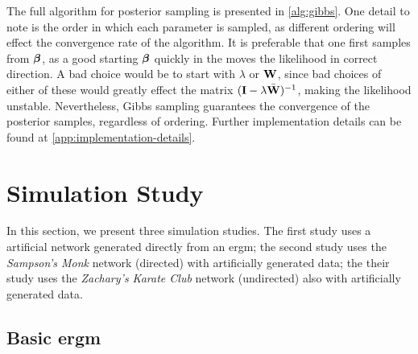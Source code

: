 \documentclass[a4paper]{article}
\begin{document}
\dinkus

The full algorithm for posterior sampling is presented in \autoref{alg:gibbs}.
One detail to note is the order in which each parameter is sampled,
as different ordering will effect the convergence rate of the algorithm.
It is preferable that one first samples from $\boldsymbol{\beta}$,
as a good starting $\boldsymbol{\beta}$ quickly in the moves the likelihood in correct direction.
A bad choice would be to start with $\lambda$ or $\mathbf{W}$,
since bad choices of either of these would greatly effect the matrix $(\mathbf{I}-\lambda\bar{\mathbf{W}})^{-1}$,
making the likelihood unstable.
Nevertheless, Gibbs sampling guarantees the convergence of the posterior samples,
regardless of ordering.
Further implementation details can be found at \autoref{app:implementation-details}.

\section{Simulation Study}\label{sec:simulation-study}

In this section,
we present three simulation studies.
The first study uses a artificial network generated directly from an \gls{ergm};
the second study uses the \emph{Sampson's Monk} network (directed) with artificially generated data;
the their study uses the \emph{Zachary's Karate Club} network (undirected) also with artificially generated data.

\subsection{Basic \gls{ergm}}\label{subsec:P}




\end{document}
